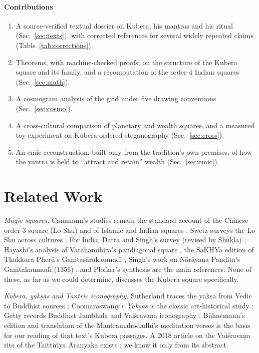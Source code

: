 \documentclass[journal]{IEEEtran}
\theoremstyle{definition}
\begin{document}
\paragraph*{Contributions}
\begin{enumerate}
\item A source-verified textual dossier on Kubera, his mantras and his ritual (Sec.~\ref{sec:texts}), with corrected references for several widely repeated claims (Table~\ref{tab:corrections}).
\item Theorems, with machine-checked proofs, on the structure of the Kubera square and its family, and a recomputation of the order-4 Indian squares (Sec.~\ref{sec:math}).
\item A cosmogram analysis of the grid under five drawing conventions (Sec.~\ref{sec:cosmo}).
\item A cross-cultural comparison of planetary and wealth squares, and a measured toy experiment on Kubera-ordered steganography (Sec.~\ref{sec:cross}).
\item An emic reconstruction, built only from the tradition's own premises, of how the yantra is held to ``attract and retain'' wealth (Sec.~\ref{sec:emic}).
\end{enumerate}

\section{Related Work}
\label{sec:related}
\emph{Magic squares.} Cammann's studies remain the standard account of the Chinese order-3 square (Lo Shu) and of Islamic and Indian squares \cite{cammann1960,cammann1961,cammann1969a,cammann1969b}. Swetz surveys the Lo Shu across cultures \cite{swetz2008}. For India, Datta and Singh's survey (revised by Shukla) \cite{datta1992}, Hayashi's analysis of Var\=ahamihira's pandiagonal square \cite{hayashi1987}, the SaKHYa edition of Thakkura Pher\=u's Ga\d nitas\=arakaumud\=\i{} \cite{sakhya2009}, Singh's work on N\=ar\=aya\d na Pa\d n\d dita's Ga\d nitakaumud\=\i{} (1356) \cite{singh1998}, and Plofker's synthesis \cite{plofker2009} are the main references. None of these, as far as we could determine, discusses the Kubera square specifically.

\emph{Kubera, yak\d sas and Tantric iconography.} Sutherland traces the yak\d sa from Vedic to Buddhist sources \cite{sutherland1991}; Coomaraswamy's \emph{Yak\d sas} is the classic art-historical study \cite{coomaraswamy1928}; Getty records Buddhist Jambhala and Vai\'srava\d na iconography \cite{getty1914}. B\"uhnemann's edition and translation of the Mantramahodadhi's meditation verses \cite{buhnemann2000} is the basis for our reading of that text's Kubera passages. A 2018 article on the Vai\'srava\d na rite of the Taittir\=\i ya \=Ara\d nyaka exists \cite{joi2018vaisravana}; we know it only from its abstract.
\end{document}

